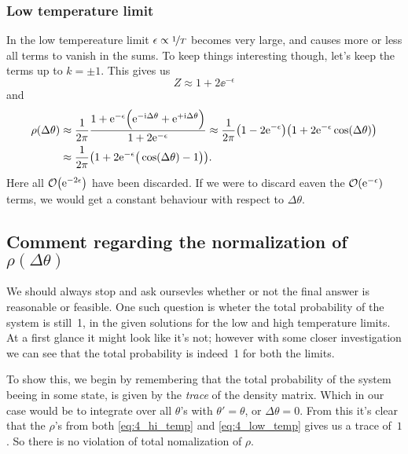\documentclass[11pt,letter, swedish, english
]{article}
\begin{document}
\subsubsection{Low temperature limit}
In the low tempereature limit $\epsilon\propto\nicefrac{1}{T}$ becomes
very large, and causes more or less all terms to vanish in the sums. To
keep things interesting though, let's keep the terms up to
$k=\pm1$. This gives us
\begin{equation}
Z\approx 1+2\ee^{-\epsilon}
\end{equation}
and
\begin{equation}\label{eq:4_low_temp}
\begin{aligned}
\rho(\Delta\theta)&\approx \frac{1}{2\pi}
\frac{1+\mathrm{e}^{-\epsilon}\Big(\mathrm{e}^{-\mathrm{i}\Delta\theta}+\mathrm{e}^{+\mathrm{i}\Delta\theta}\Big)}{1+2\mathrm{e}^{-\epsilon}}
\approx\frac{1}{2\pi}
\qty(1-2\mathrm{e}^{-\epsilon})\qty(1+2\mathrm{e}^{-\epsilon}\cos(\Delta\theta))\\
&\approx \frac{1}{2\pi}\qty(1 + 2\mathrm{e}^{-\epsilon}\big(\cos(\Delta\theta)-1\big)).
\end{aligned}
\end{equation}
Here all $\order{\ee^{-2\epsilon}}$ have been discarded. If we were to
discard eaven the $\order{\ee^{-\epsilon}}$ terms, we would get a
constant behaviour with respect to $\Delta\theta$.


\subsection*{Comment regarding the normalization of $\rho(\Delta\theta)$}
We should always stop and ask oursevles whether or not the final
answer is reasonable or feasible. One such question is wheter the total
probability of the system is still~1, in the given solutions for the
low and high temperature limits. At a first glance it might look like
it's not; however with some closer investigation we can see that the
total probability is indeed~1 for both the limits.

To show this, we begin by remembering that the total probability of the
system beeing in some state, is given by the \emph{trace} of the
density matrix. Which in our case would be to integrate over all
$\theta$'s with $\theta'=\theta$, or $\Delta\theta=0$. From this it's
clear that the $\rho$'s from both \eqref{eq:4_hi_temp} and
\eqref{eq:4_low_temp} gives us a trace of~$1$. So there is no
violation of total nomalization of $\rho$. 
\end{document}
